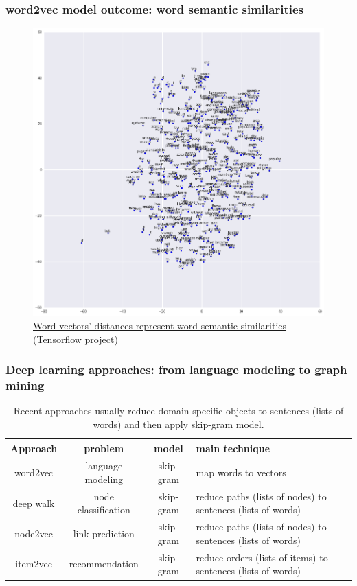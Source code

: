 \documentclass{article}
\begin{document}
\begin{landscape}
\subsubsection{word2vec model outcome: word semantic similarities}
\begin{figure}[H]
	\centering
	\includegraphics[width=0.6\linewidth]{tsne}
	\caption{
		\href{https://www.tensorflow.org/tutorials/word2vec/}
		{Word vectors' distances represent word semantic similarities} (Tensorflow project)
	}
	\label{fig:tsne}
\end{figure}
\subsubsection{Deep learning approaches: from language modeling to graph mining}
\begin{table}[H]\centering
	\caption{
		Recent approaches usually reduce domain specific objects to sentences (lists of words) and then apply skip-gram model.
	}
	\begin{tabularx}{\textwidth}{|c|c|c|X|}  \hline
		Approach & problem & model & main technique \\ \hline
		word2vec & language modeling & skip-gram & map words to vectors \\ \hline
		deep walk & node classification & skip-gram & reduce paths (lists of nodes) to sentences (lists of words) \\ \hline
		node2vec & link prediction & skip-gram & reduce paths (lists of nodes) to sentences (lists of words) \\ \hline
		item2vec & recommendation & skip-gram & reduce orders (lists of items) to sentences (lists of words) \\ \hline
	\end{tabularx}
	\label{tab:related-work}
\end{table}


\end{landscape}
\end{document}
